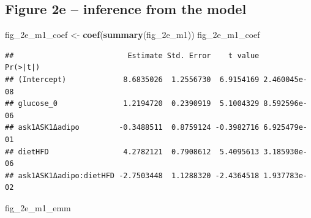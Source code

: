 \documentclass[]{book}
\newenvironment{Shaded}{\begin{snugshade}}{\end{snugshade}}
\newcommand{\DataTypeTok}[1]{\textcolor[rgb]{0.13,0.29,0.53}{#1}}
\newcommand{\KeywordTok}[1]{\textcolor[rgb]{0.13,0.29,0.53}{\textbf{#1}}}
\newcommand{\NormalTok}[1]{#1}
\newcommand{\OperatorTok}[1]{\textcolor[rgb]{0.81,0.36,0.00}{\textbf{#1}}}
\newcommand{\OtherTok}[1]{\textcolor[rgb]{0.56,0.35,0.01}{#1}}
\newcommand{\StringTok}[1]{\textcolor[rgb]{0.31,0.60,0.02}{#1}}
\begin{document}
\hypertarget{figure-2e-inference-from-the-model}{%
\subsection{Figure 2e -- inference from the model}\label{figure-2e-inference-from-the-model}}

\begin{Shaded}
\begin{Highlighting}[]
\NormalTok{fig_2e_m1_coef <-}\StringTok{ }\KeywordTok{coef}\NormalTok{(}\KeywordTok{summary}\NormalTok{(fig_2e_m1))}
\NormalTok{fig_2e_m1_coef}
\end{Highlighting}
\end{Shaded}

\begin{verbatim}
##                          Estimate Std. Error    t value     Pr(>|t|)
## (Intercept)             8.6835026  1.2556730  6.9154169 2.460045e-08
## glucose_0               1.2194720  0.2390919  5.1004329 8.592596e-06
## ask1ASK1Δadipo         -0.3488511  0.8759124 -0.3982716 6.925479e-01
## dietHFD                 4.2782121  0.7908612  5.4095613 3.185930e-06
## ask1ASK1Δadipo:dietHFD -2.7503448  1.1288320 -2.4364518 1.937783e-02
\end{verbatim}

\begin{Shaded}
\end{Shaded}

\begin{Shaded}
\begin{Highlighting}[]
\NormalTok{fig_2e_m1_emm}
\end{Highlighting}
\end{Shaded}
\end{document}
